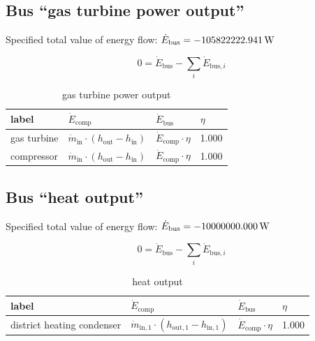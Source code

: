 \subsection{Bus ``gas turbine power output''}

Specified total value of energy flow: $\dot{E}_\mathrm{bus} = \unit[-105822222.941]{W}$

\begin{equation}
\label{eq:Bus_energy_flow_sum}
0=\dot{E}_\mathrm{bus} -\sum_i \dot{E}_{\mathrm{bus,}i}
\end{equation}

\begin{table}[H]\begin{center}
\begin{tabular}{llll}
\toprule
       label &                                                   $\dot{E}_\mathrm{comp}$ &              $\dot{E}_\mathrm{bus}$ & $\eta$ \\
\midrule
 gas turbine &  $\dot{m}_\mathrm{in} \cdot \left(h_\mathrm{out} - h_\mathrm{in} \right)$ &  $\dot{E}_\mathrm{comp} \cdot \eta$ &  1.000 \\
  compressor &  $\dot{m}_\mathrm{in} \cdot \left(h_\mathrm{out} - h_\mathrm{in} \right)$ &  $\dot{E}_\mathrm{comp} \cdot \eta$ &  1.000 \\
\bottomrule
\end{tabular}
\caption{gas turbine power output}
\end{center}\end{table}




\subsection{Bus ``heat output''}

Specified total value of energy flow: $\dot{E}_\mathrm{bus} = \unit[-10000000.000]{W}$

\begin{equation}
\label{eq:Bus_energy_flow_sum}
0=\dot{E}_\mathrm{bus} -\sum_i \dot{E}_{\mathrm{bus,}i}
\end{equation}

\begin{table}[H]\begin{center}
\begin{tabular}{llll}
\toprule
                      label &                                                         $\dot{E}_\mathrm{comp}$ &              $\dot{E}_\mathrm{bus}$ & $\eta$ \\
\midrule
 district heating condenser &  $\dot{m}_\mathrm{in,1} \cdot \left(h_\mathrm{out,1} - h_\mathrm{in,1} \right)$ &  $\dot{E}_\mathrm{comp} \cdot \eta$ &  1.000 \\
\bottomrule
\end{tabular}
\caption{heat output}
\end{center}\end{table}




